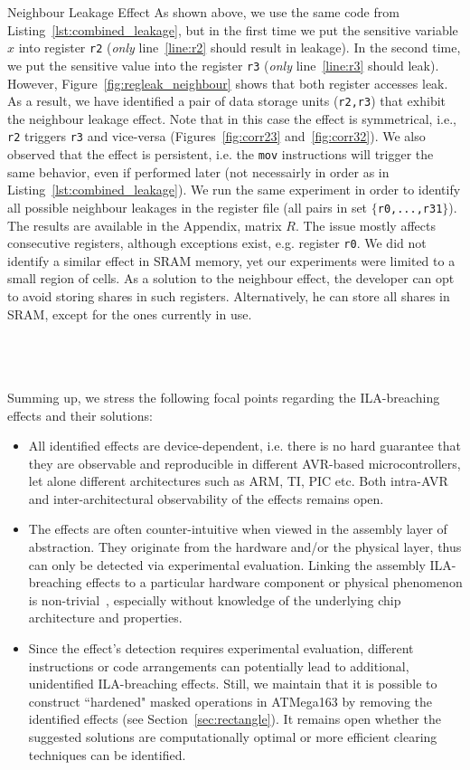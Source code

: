 \begin{subsection}{Neighbour Leakage Effect}
As shown above, we use the same code from Listing~\ref{lst:combined_leakage}, 
but in the first time we put the sensitive variable $x$ into register 
\texttt{r2} (\emph{only} line~\ref{line:r2} should result in leakage).
In the second time, we put the sensitive value into the register 
\texttt{r3} (\emph{only} line~\ref{line:r3} should leak). 
However, Figure~\ref{fig:regleak_neighbour} shows that both register accesses leak.
As a result, we have identified a pair of data storage units (\texttt{r2,r3}) that exhibit the neighbour leakage effect. Note that in this case the effect is symmetrical, i.e., \texttt{r2} triggers \texttt{r3} and vice-versa (Figures~\ref{fig:corr23} and~\ref{fig:corr32}). We also observed that the effect is persistent, i.e. the \texttt{mov} instructions will trigger the same behavior, even if performed later (not necessairly in order as in Listing~\ref{lst:combined_leakage}). We run the same experiment in order to identify all possible neighbour leakages in the register file (all pairs in set $\{$\texttt{r0,...,r31}$\}$). The results are available in the Appendix, matrix $R$. The issue mostly affects consecutive registers, although exceptions exist, e.g. register \texttt{r0}. We did not identify a similar effect in SRAM memory, yet our experiments were limited to a small region of cells. As a solution to the neighbour effect, the developer can opt to avoid storing shares in such registers. Alternatively, he can store all shares in SRAM, except for the ones currently in use. 
\end{subsection}\\\\\\
Summing up, we stress the following focal points regarding the ILA-breaching effects and their solutions:
\begin{itemize}
\item All identified effects are device-dependent, i.e. there is no hard guarantee that they are observable and reproducible in different AVR-based microcontrollers, let alone different architectures such as ARM, TI, PIC etc. Both intra-AVR and inter-architectural observability of the effects remains open.
\item The effects are often counter-intuitive when viewed in the assembly layer of abstraction. They originate from the hardware and/or the physical layer, thus can only be detected via experimental evaluation. Linking the assembly ILA-breaching effects to a particular hardware component or physical phenomenon is non-trivial~\cite{DBLP:conf/eurocrypt/RenauldSVKF11,DBLP:phd/dnb/Stottinger12}, especially without knowledge of the underlying chip architecture and properties.
\item  Since the effect's detection requires experimental evaluation, different instructions or code arrangements can potentially lead to additional, unidentified ILA-breaching effects. Still, we maintain that it is possible to construct ``hardened" masked operations in ATMega163 by removing the identified effects (see Section~\ref{sec:rectangle}). It remains open whether the suggested solutions are computationally optimal or more efficient clearing techniques can be identified.
\end{itemize}

